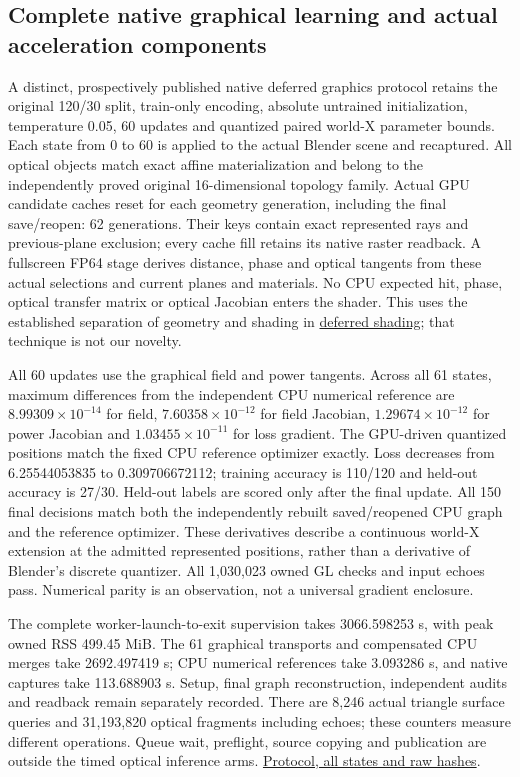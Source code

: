 \documentclass[11pt]{article}
\begin{document}
\subsection*{Complete native graphical learning and actual acceleration components}

A distinct, prospectively published native deferred graphics protocol retains the original 120/30 split, train-only encoding, absolute untrained initialization, temperature 0.05, 60 updates and quantized paired world-X parameter bounds. Each state from 0 to 60 is applied to the actual Blender scene and recaptured. All optical objects match exact affine materialization and belong to the independently proved original 16-dimensional topology family. Actual GPU candidate caches reset for each geometry generation, including the final save/reopen: 62 generations. Their keys contain exact represented rays and previous-plane exclusion; every cache fill retains its native raster readback. A fullscreen FP64 stage derives distance, phase and optical tangents from these actual selections and current planes and materials. No CPU expected hit, phase, optical transfer matrix or optical Jacobian enters the shader. This uses the established separation of geometry and shading in \href{https://developer.nvidia.com/gpugems/gpugems2/part-ii-shading-lighting-and-shadows/chapter-9-deferred-shading-stalker}{deferred shading}; that technique is not our novelty.

All 60 updates use the graphical field and power tangents. Across all 61 states, maximum differences from the independent CPU numerical reference are $8.99309\times10^{-14}$ for field, $7.60358\times10^{-12}$ for field Jacobian, $1.29674\times10^{-12}$ for power Jacobian and $1.03455\times10^{-11}$ for loss gradient. The GPU-driven quantized positions match the fixed CPU reference optimizer exactly. Loss decreases from 6.25544053835 to 0.309706672112; training accuracy is 110/120 and held-out accuracy is 27/30. Held-out labels are scored only after the final update. All 150 final decisions match both the independently rebuilt saved/reopened CPU graph and the reference optimizer. These derivatives describe a continuous world-X extension at the admitted represented positions, rather than a derivative of Blender's discrete quantizer. All 1,030,023 owned GL checks and input echoes pass. Numerical parity is an observation, not a universal gradient enclosure.

The complete worker-launch-to-exit supervision takes 3066.598253 s, with peak owned RSS 499.45 MiB. The 61 graphical transports and compensated CPU merges take 2692.497419 s; CPU numerical references take 3.093286 s, and native captures take 113.688903 s. Setup, final graph reconstruction, independent audits and readback remain separately recorded. There are 8,246 actual triangle surface queries and 31,193,820 optical fragments including echoes; these counters measure different operations. Queue wait, preflight, source copying and publication are outside the timed optical inference arms. \href{https://github.com/Agnuxo1/Neuro3D/blob/a6d0fbec5011bdc76abad71edac86519016348f4/Docs/NATIVE\_DEFERRED\_GRAPHICS\_TRAINING\_PROTOCOL\_2026-10-09.md}{Protocol, all states and raw hashes}.
\end{document}
